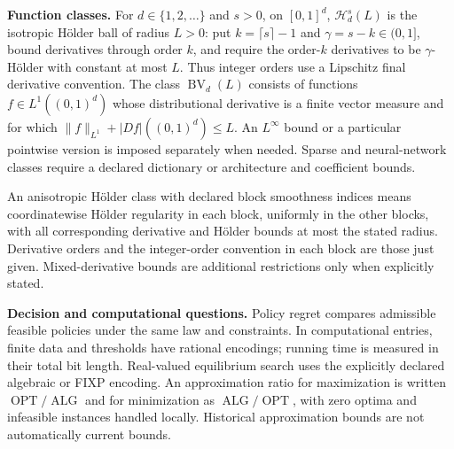 \documentclass[11pt,a4paper]{article}
\begin{document}
\textbf{Function classes.}
For $d\in\{1,2,\ldots\}$ and $s>0$, on $[0,1]^d$, $\mathcal H_d^s(L)$ is the isotropic Hölder ball of radius
$L>0$: put $k=\lceil s\rceil-1$ and $\gamma=s-k\in(0,1]$, bound derivatives
through order $k$, and require the order-$k$ derivatives to be
$\gamma$-Hölder with constant at most $L$. Thus integer orders use a
Lipschitz final derivative convention. The class
$\operatorname{BV}_d(L)$ consists of functions $f\in L^1((0,1)^d)$ whose
distributional derivative is a finite vector measure and for which
$\|f\|_{L^1}+|Df|((0,1)^d)\leq L$.
An $L^\infty$ bound or a particular pointwise version is imposed separately
when needed. Sparse and neural-network classes require a declared
dictionary or architecture and coefficient bounds.

An anisotropic H\"older class with declared block smoothness indices means
coordinatewise H\"older regularity in each block, uniformly in the other
blocks, with all corresponding derivative and H\"older bounds at most
the stated radius. Derivative orders and the integer-order convention in
each block are those just given. Mixed-derivative bounds are additional
restrictions only when explicitly stated.

\textbf{Decision and computational questions.}
Policy regret compares admissible feasible policies under the same law and
constraints. In computational entries, finite data and thresholds have
rational encodings; running time is measured in their total bit length.
Real-valued equilibrium search uses the explicitly declared algebraic or
FIXP encoding. An approximation ratio for maximization is written
$\operatorname{OPT}/\operatorname{ALG}$ and for minimization as
$\operatorname{ALG}/\operatorname{OPT}$, with zero optima and infeasible
instances handled locally. Historical approximation bounds are not
automatically current bounds.
\end{document}
